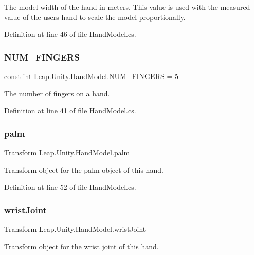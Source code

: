The model width of the hand in meters. This value is used with the measured value of the user\textquotesingle{}s hand to scale the model proportionally. 

Definition at line 46 of file Hand\+Model.\+cs.

\mbox{\label{class_leap_1_1_unity_1_1_hand_model_a251c19cef47a9e349acfaa333219a495}} 
\subsubsection{\texorpdfstring{NUM\_FINGERS}{NUM\_FINGERS}}
{\footnotesize\ttfamily const int Leap.\+Unity.\+Hand\+Model.\+N\+U\+M\+\_\+\+F\+I\+N\+G\+E\+RS = 5}

The number of fingers on a hand. 

Definition at line 41 of file Hand\+Model.\+cs.

\mbox{\label{class_leap_1_1_unity_1_1_hand_model_a9ed203915ef3ad91ea37b705c1fcffa1}} 
\subsubsection{\texorpdfstring{palm}{palm}}
{\footnotesize\ttfamily Transform Leap.\+Unity.\+Hand\+Model.\+palm}

Transform object for the palm object of this hand. 

Definition at line 52 of file Hand\+Model.\+cs.

\mbox{\label{class_leap_1_1_unity_1_1_hand_model_a5dd72502f20abe5fcddbeabe6bf0bfc9}} 
\subsubsection{\texorpdfstring{wristJoint}{wristJoint}}
{\footnotesize\ttfamily Transform Leap.\+Unity.\+Hand\+Model.\+wrist\+Joint}

Transform object for the wrist joint of this hand. 

